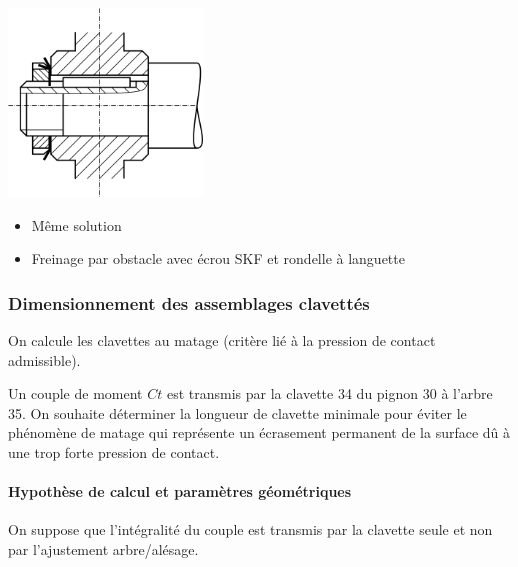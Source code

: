 \documentclass[11pt,oneside]{article}
\begin{document}
\noindent\begin{minipage}[c]{.45\linewidth}
 \begin{center}
  \includegraphics[height=5cm]{png/Fig7}

 \end{center}


\begin{itemize}
\item Même solution
\item Freinage par obstacle avec écrou SKF et rondelle à languette
\end{itemize}
 
\end{minipage} 

\subsubsection{Dimensionnement des assemblages clavettés}


On calcule les clavettes au matage (critère
lié à la pression de contact admissible).

Un couple de moment $Ct$ est transmis par la clavette 34 du pignon 30 à l'arbre
35. On souhaite déterminer la longueur de clavette minimale pour éviter le
phénomène de matage qui représente un écrasement permanent de la surface dû à
une trop forte pression de contact. 

\paragraph*{Hypothèse de calcul et paramètres géométriques}
On suppose que l'intégralité du couple est transmis par la clavette seule et
non par l'ajustement arbre/alésage.
\end{document}
